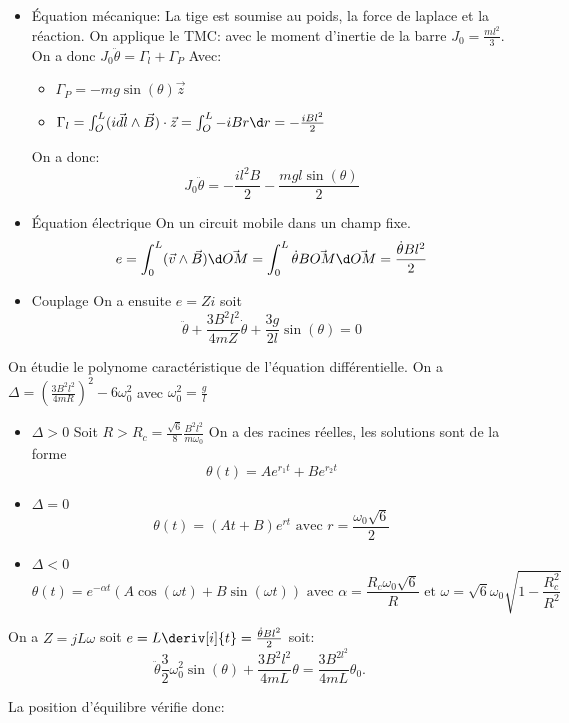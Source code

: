 \begin{Answer}
  \Question
  \begin{itemize}
    \item Équation mécanique:
      La tige est soumise au poids, la force de laplace et la réaction.
      On applique le TMC: avec le moment d'inertie de la barre $J_{0}= \frac{ml^{2}}{3}$.
      On a donc $J_{0}\ddot{\theta} = \Gamma_{l}+\Gamma_{P}$
      Avec:
      \begin{itemize}
        \item $\Gamma_{P}= -mg\sin(\theta)\vec{z}$
        \item $\Gamma_{l}= \int_{O}^{L}(i\vec{dl}\wedge \vec{B})\cdot\vec{z} = \int_{O}^{L} -i Br\d r = - \frac{iBl^{2}}{2}$
      \end{itemize}
      On a donc:
      \[
      J_{0}\ddot{\theta}= -\frac{il^{2}B}{2}-\frac{mgl\sin(\theta)}{2}
      \]
    \item Équation électrique
      On un circuit mobile dans un champ fixe.
      \[
      e  = \int_{0}^{L}(\vec{v}\wedge\vec{B})\d\vec{OM} = \int_{0}^{L} \dot{\theta}B\vec{OM}\d\vec{OM} = \frac{\dot{\theta}Bl^{2}}{2}
      \]
    \item Couplage
      On a ensuite $e=Zi$ soit
      \[
\boxed{\ddot{\theta} + \frac{3B^{2}l^{2}}{4mZ}\dot{\theta}+\frac{3g}{2l}\sin(\theta)=0}
      \]

   \end{itemize}
      \Question
      On étudie le polynome caractéristique de l'équation différentielle. On a $\Delta = \left(\frac{3B^{2}l^{2}}{4mR}\right)^{2}-6\omega_{0}^{2}$ avec $\omega_{0}^{2}=\frac{g}{l}$
      \begin{itemize}
        \item $\Delta >0 $ Soit $R >R_{c}=\frac{\sqrt{6}}{8}\frac{B^{2}l^{2}}{m\omega_{0}}$
          On a des racines réelles, les solutions sont de la forme
          \[
          \theta(t)= Ae^{r_{1}t}+Be^{r_{2}t}
          \]
        \item $\Delta=0$
          \[
          \theta(t) = (At+B)e^{rt} \text{ avec } r= \frac{\omega_{0}\sqrt{6}}{2}
          \]
        \item $\Delta<0$
          \[
          \theta(t)= e^{-\alpha t}(A\cos(\omega t)+B\sin(\omega t)) \text{ avec } \alpha =\frac{R_{c}\omega_{0}\sqrt{6}}{R} \text{ et } \omega = \sqrt{6}\omega_{0}\sqrt{1-\frac{R_{c}^{2}}{R^{2}}}
          \]
      \end{itemize}
      \Question On a $Z= jL\omega$ soit $e = L \deriv[i]{t} = \frac{\dot{\theta}Bl^{2}}{2}$
    soit:
    \[
      \ddot{\theta} \frac{3}{2}\omega_{0}^{2}\sin(\theta)+\frac{3B^{2}l^{2}}{4mL}\theta = \frac{3B^{2l^{2}}}{4mL}\theta_{0}.
    \]

    La position d'équilibre vérifie donc:
    \end{Answer}

